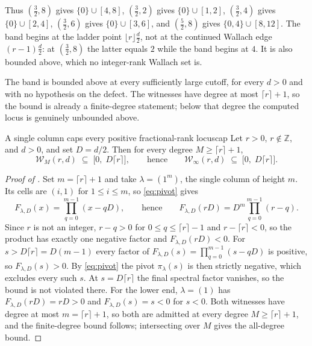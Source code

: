 \documentclass[11pt,letterpaper]{article}
\newcommand{\Zint}{\mathbb{Z}}
\begin{document}
Thus $(\tfrac32,8)$ gives $\{0\}\cup[4,8]$, $(\tfrac32,2)$ gives
$\{0\}\cup[1,2]$, $(\tfrac32,4)$ gives $\{0\}\cup[2,4]$, $(\tfrac32,6)$ gives
$\{0\}\cup[3,6]$, and $(\tfrac52,8)$ gives $\{0,4\}\cup[8,12]$. The band begins at the ladder point
$\lfloor r\rfloor\tfrac{d}{2}$, not at the continued Wallach edge
$(r-1)\tfrac{d}{2}$: at $(\tfrac32,8)$ the latter equals $2$ while the band begins
at $4$. It is also bounded above, which no integer-rank Wallach set is.

The band is bounded above at every sufficiently large cutoff, for every $d>0$
and with no hypothesis on the defect. The witnesses have degree at most
$\lceil r\rceil+1$, so the bound is already a finite-degree statement; below that
degree the computed locus is genuinely unbounded above.

\begin{proposition}{A single column caps every positive fractional-rank locus}{cap}
Let $r>0$, $r\notin\Zint$, and $d>0$, and set $D=d/2$. Then for every degree
$M\ge\lceil r\rceil+1$,
\begin{equation}
  \mathcal{W}_M(r,d)\;\subseteq\;\bigl[0,\;D\lceil r\rceil\bigr],
  \qquad\text{hence}\qquad
  \mathcal{W}_\infty(r,d)\;\subseteq\;\bigl[0,\;D\lceil r\rceil\bigr].
  \label{eq:cap}
\end{equation}
\end{proposition}

\begin{proof}[Proof of ]
Set $m=\lceil r\rceil+1$ and take $\lambda=(1^m)$, the single column of height
$m$. Its cells are $(i,1)$ for $1\le i\le m$, so \eqref{eq:pivot} gives
\begin{equation*}
  F_{\lambda,D}(x)=\prod_{q=0}^{m-1}(x-qD),
  \qquad\text{hence}\qquad
  F_{\lambda,D}(rD)=D^{m}\prod_{q=0}^{m-1}(r-q).
\end{equation*}
Since $r$ is not an integer, $r-q>0$ for $0\le q\le\lceil r\rceil-1$ and
$r-\lceil r\rceil<0$, so the product has exactly one negative factor and
$F_{\lambda,D}(rD)<0$. For $s>D\lceil r\rceil=D(m-1)$ every factor of
$F_{\lambda,D}(s)=\prod_{q=0}^{m-1}(s-qD)$ is positive, so $F_{\lambda,D}(s)>0$.
By \eqref{eq:pivot} the pivot $\pi_\lambda(s)$ is then strictly negative, which
excludes every such $s$. At $s=D\lceil r\rceil$ the final spectral factor
vanishes, so the bound is not violated there. For the lower end, $\lambda=(1)$
has $F_{\lambda,D}(rD)=rD>0$ and $F_{\lambda,D}(s)=s<0$ for $s<0$. Both witnesses
have degree at most $m=\lceil r\rceil+1$, so both are admitted at every degree
$M\ge\lceil r\rceil+1$, and the finite-degree bound follows; intersecting over
$M$ gives the all-degree bound.
\end{proof}
\end{document}
